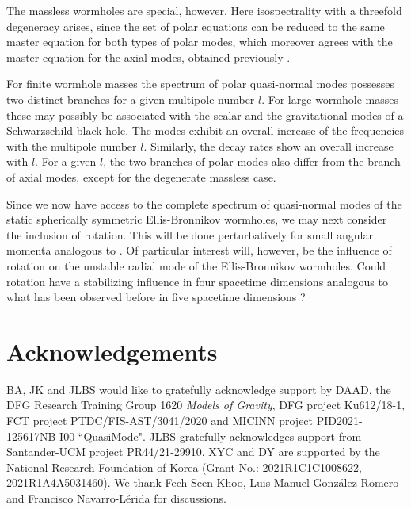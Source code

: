 \documentclass[a4paper,12pt]{article}
\begin{document}
The massless wormholes are special, however. 
Here isospectrality with a threefold degeneracy arises, since the set of polar equations can be reduced to the same master equation for both types of polar 
%
modes, which moreover agrees with the master equation for the axial modes, obtained previously \cite{Blazquez-Salcedo:2018ipc}.

For finite wormhole masses the spectrum of polar quasi-normal modes possesses two distinct branches for a given multipole number $l$.
For large wormhole masses these may {possibly be} associated with the scalar and the gravitational modes of a Schwarzschild black hole.
The modes exhibit an overall increase of the frequencies with the multipole number $l$.
Similarly, the decay rates show an overall increase with $l$.
For a given $l$, the two branches of polar modes also differ from the branch of axial modes, except for the degenerate massless case.


Since we now have access to the complete spectrum of quasi-normal modes of the static spherically symmetric Ellis-Bronnikov wormholes, we may next consider the inclusion of rotation.
This will be done perturbatively for small angular momenta analogous to \cite{Blazquez-Salcedo:2022eik}.
Of particular interest will, however, be the influence of rotation on the unstable radial mode of the Ellis-Bronnikov wormholes.
Could rotation have a stabilizing influence in four spacetime dimensions analogous to what has been observed before in five spacetime dimensions 
\cite{Dzhunushaliev:2013jja}?



 
\section*{Acknowledgements}

BA, JK and JLBS would like to gratefully acknowledge support by DAAD, the DFG Research Training Group 1620 \textit{Models of Gravity}, DFG project Ku612/18-1, FCT project PTDC/FIS-AST/3041/2020 and MICINN project PID2021-125617NB-I00 ``QuasiMode".
JLBS gratefully acknowledges support from Santander-UCM project PR44/21‐29910. XYC and DY are supported by the National Research Foundation of Korea (Grant No.: 2021R1C1C1008622, 2021R1A4A5031460).
We thank Fech Scen Khoo, Luis Manuel González-Romero and Francisco Navarro-Lérida for discussions.

  
%
\end{document}
